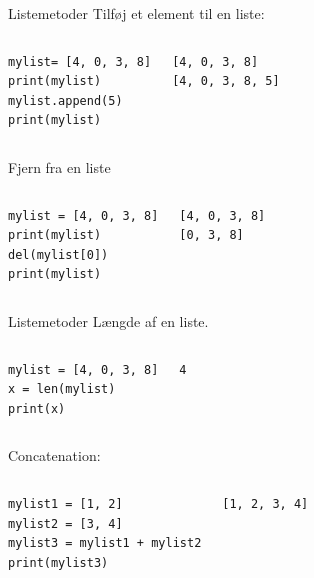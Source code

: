 \begin{frame}[fragile]{Listemetoder}
	Tilføj et element til en liste:
	\begin{columns}
		\begin{lstlisting}[style=python]
mylist= [4, 0, 3, 8]
print(mylist)
mylist.append(5)
print(mylist)
		\end{lstlisting}
		\begin{lstlisting}[style=python]
[4, 0, 3, 8]
[4, 0, 3, 8, 5]
		\end{lstlisting}
	\end{columns}
	\pause
	Fjern fra en liste
	\begin{columns}
		\column{0.4\textwidth}
		\begin{lstlisting}[style=python]
mylist = [4, 0, 3, 8]
print(mylist)
del(mylist[0])
print(mylist)
		\end{lstlisting}
		\column{0.4\textwidth}
		\begin{lstlisting}[style=python]
[4, 0, 3, 8]
[0, 3, 8]
		\end{lstlisting}
	\end{columns}
\end{frame}

\begin{frame}[fragile]{Listemetoder}
	Længde af en liste.
	\begin{columns}
		\column{0.4\textwidth}
		\begin{lstlisting}[style=python]
mylist = [4, 0, 3, 8]
x = len(mylist)
print(x)
		\end{lstlisting}
		\pause
		
		\begin{lstlisting}[style=python]
4
		\end{lstlisting}
	\end{columns}
	\pause
	Concatenation:
	\begin{columns}
		\begin{lstlisting}[style=python]
mylist1 = [1, 2]
mylist2 = [3, 4]
mylist3 = mylist1 + mylist2
print(mylist3)
		\end{lstlisting}
		\pause
		
		\column{0.4\textwidth}
		\begin{lstlisting}[style=python]
[1, 2, 3, 4]
		\end{lstlisting}
	\end{columns}
\end{frame}

